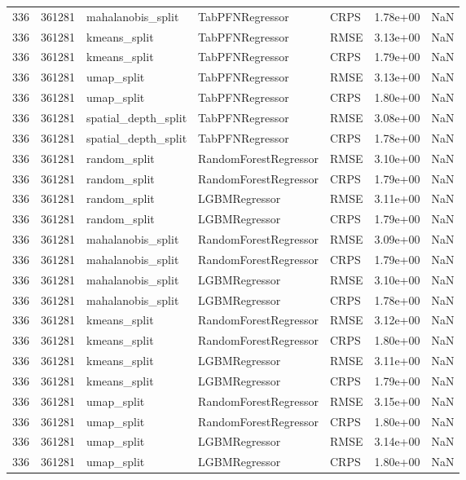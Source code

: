 \begin{tabular}{rrlllrr}
336 & 361281 & mahalanobis\_split & TabPFNRegressor & CRPS & 1.78e+00 & NaN \\
336 & 361281 & kmeans\_split & TabPFNRegressor & RMSE & 3.13e+00 & NaN \\
336 & 361281 & kmeans\_split & TabPFNRegressor & CRPS & 1.79e+00 & NaN \\
336 & 361281 & umap\_split & TabPFNRegressor & RMSE & 3.13e+00 & NaN \\
336 & 361281 & umap\_split & TabPFNRegressor & CRPS & 1.80e+00 & NaN \\
336 & 361281 & spatial\_depth\_split & TabPFNRegressor & RMSE & 3.08e+00 & NaN \\
336 & 361281 & spatial\_depth\_split & TabPFNRegressor & CRPS & 1.78e+00 & NaN \\
336 & 361281 & random\_split & RandomForestRegressor & RMSE & 3.10e+00 & NaN \\
336 & 361281 & random\_split & RandomForestRegressor & CRPS & 1.79e+00 & NaN \\
336 & 361281 & random\_split & LGBMRegressor & RMSE & 3.11e+00 & NaN \\
336 & 361281 & random\_split & LGBMRegressor & CRPS & 1.79e+00 & NaN \\
336 & 361281 & mahalanobis\_split & RandomForestRegressor & RMSE & 3.09e+00 & NaN \\
336 & 361281 & mahalanobis\_split & RandomForestRegressor & CRPS & 1.79e+00 & NaN \\
336 & 361281 & mahalanobis\_split & LGBMRegressor & RMSE & 3.10e+00 & NaN \\
336 & 361281 & mahalanobis\_split & LGBMRegressor & CRPS & 1.78e+00 & NaN \\
336 & 361281 & kmeans\_split & RandomForestRegressor & RMSE & 3.12e+00 & NaN \\
336 & 361281 & kmeans\_split & RandomForestRegressor & CRPS & 1.80e+00 & NaN \\
336 & 361281 & kmeans\_split & LGBMRegressor & RMSE & 3.11e+00 & NaN \\
336 & 361281 & kmeans\_split & LGBMRegressor & CRPS & 1.79e+00 & NaN \\
336 & 361281 & umap\_split & RandomForestRegressor & RMSE & 3.15e+00 & NaN \\
336 & 361281 & umap\_split & RandomForestRegressor & CRPS & 1.80e+00 & NaN \\
336 & 361281 & umap\_split & LGBMRegressor & RMSE & 3.14e+00 & NaN \\
336 & 361281 & umap\_split & LGBMRegressor & CRPS & 1.80e+00 & NaN \\

\end{tabular}
